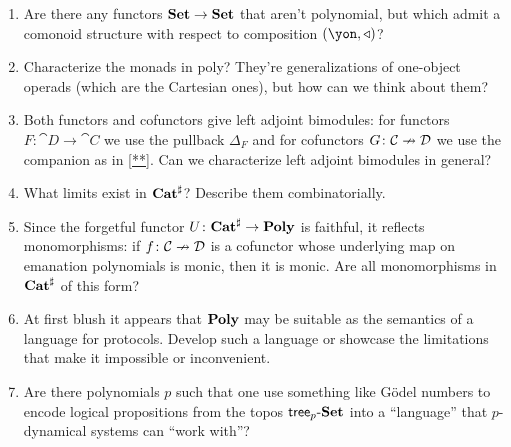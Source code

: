 \documentclass[Book-Poly]{subfiles}
\begin{document}
\begin{enumerate}
  \item Are there any functors $\mathbf{Set}\to\mathbf{Set}$ that aren't polynomial, but which admit a comonoid structure with respect to composition $(\yon,\tri)$?
  \item Characterize the monads in poly? They're generalizations of one-object operads (which are the Cartesian ones), but how can we think about them?
  \item Both functors and cofunctors give left adjoint bimodules: for functors $F\colon\cat{D}\to\cat{C}$ we use the pullback $\Delta_F$ and for cofunctors $G\colon\mathcal{C}\nrightarrow\mathcal{D}$ we use the companion as in \cref{**}. Can we characterize left adjoint bimodules in general?
  \item What limits exist in $\mathbf{Cat}^\sharp$? Describe them combinatorially.
  \item Since the forgetful functor $U\colon\mathbf{Cat}^\sharp\to\mathbf{Poly}$ is faithful, it reflects monomorphisms: if $f\colon\mathcal{C}\nrightarrow\mathcal{D}$ is a cofunctor whose underlying map on emanation polynomials is monic, then it is monic. Are all monomorphisms in $\mathbf{Cat}^\sharp$ of this form?
  \item At first blush it appears that $\mathbf{Poly}$ may be suitable as the semantics of a language for protocols. Develop such a language or showcase the limitations that make it impossible or inconvenient.
  \item Are there polynomials $p$ such that one use something like G\"odel numbers to encode logical propositions from the topos $\mathsf{tree}_p\textnormal{-}\mathbf{Set}$ into a ``language'' that $p$-dynamical systems can ``work with''?
\end{enumerate}


% 
\end{document}
